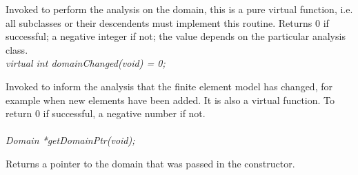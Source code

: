 Invoked to perform the analysis on the domain, this is a pure virtual
function, i.e. all subclasses or their descendents must implement this
routine. Returns 0 if successful; a negative integer if not; the value
depends on the particular analysis class. \\

{\em virtual int domainChanged(void) = 0;} 

Invoked to inform the analysis that the finite element model has
changed, for example when new elements have been added. It is also a
virtual function. To return $0$ if successful, a negative number if
not.\\ 

\\
{\em Domain *getDomainPtr(void);} 

Returns a pointer to the domain that was passed in the constructor. \\





